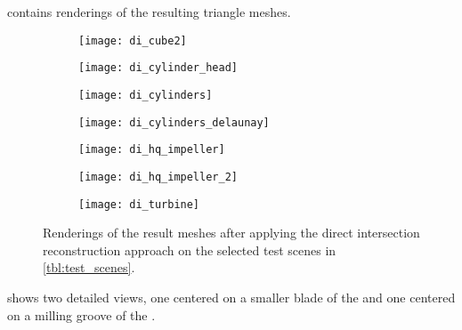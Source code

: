  contains renderings of the resulting triangle meshes.

\begin{figure}
	\centering
	\begin{subfigure}[b]{0.34\textwidth}
		\centering
		\texttt{[image: di\_cube2]}
		\caption{\cubes}
		\label{fig:di_cube2}
	\end{subfigure}
	\hspace{1cm}
	\begin{subfigure}[b]{0.34\textwidth}
		\centering
		\texttt{[image: di\_cylinder\_head]}
		\caption{\cylinderhead}
		\label{fig:di_cylinder_head}
	\end{subfigure}
	\begin{subfigure}[b]{0.34\textwidth}
		\centering
		\texttt{[image: di\_cylinders]}
		\caption{\cylinders}
		\label{fig:di_cylinders}
	\end{subfigure}
	\hspace{1cm}
	\begin{subfigure}[b]{0.34\textwidth}
		\centering
		\texttt{[image: di\_cylinders\_delaunay]}
		\caption{\cylindersd}
		\label{fig:di_cylinders_d}
	\end{subfigure}
	\begin{subfigure}[b]{0.34\textwidth}
		\centering
		\texttt{[image: di\_hq\_impeller]}
		\caption{\impeller}
		\label{fig:di_impeller}
	\end{subfigure}
	\hspace{1cm}
	\begin{subfigure}[b]{0.34\textwidth}
		\centering
		\texttt{[image: di\_hq\_impeller\_2]}
		\caption{\impellerhalf}
		\label{fig:di_impeller_2}
	\end{subfigure}
	\begin{subfigure}[b]{0.33\textwidth}
		\centering
		\texttt{[image: di\_turbine]}
		\caption{\turbine}
		\label{fig:di_turbine}
	\end{subfigure}
	\caption{
		Renderings of the result meshes after applying the direct intersection reconstruction approach on the selected test scenes in \cref{tbl:test_scenes}.
	}
	\label{fig:di_results}
\end{figure}

 shows two detailed views, one centered on a smaller blade of the \impeller and one centered on a milling groove of the \turbine.

